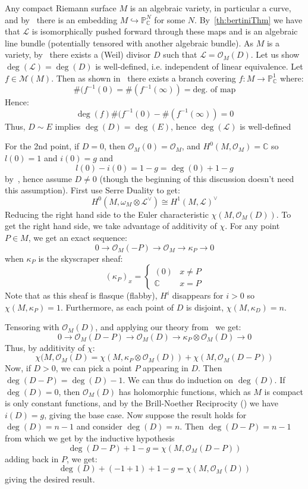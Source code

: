 \documentclass{ut-thesis}
\newenvironment{Proof}[1][]
  {\begin{ProofTcb}[#1]}
  {\end{ProofTcb}}
\newcommand{\C}{{\mathbb{C}}}
\renewcommand{\P}{{\mathbb{P}}}
\newcommand{\CM}{{\mathcal{M}}}
\newcommand{\CL}{{\mathcal{L}}}
\newcommand{\CO}{{\mathcal{O}}}
\renewcommand{\deg}{{\operatorname{deg}}}
\begin{document}
\begin{Proof}
  Any compact Riemann surface $M$ is an algebraic
  variety, in particular a curve, and by~\cite[section~6.1]{NateAlgGeo} there is an embedding $M
  \hookrightarrow \P_\C^N$ for some $N$. By~\cref{th:bertiniThm} we have
  that $\CL$ is isomorphically pushed forward through these maps and is an algebraic line bundle (potentially
  tensored with another algebraic bundle). As $M$ is
  a variety, by~\cite[section~4.3]{NateAlgGeo} there exists a (Weil) divisor $D$ such that $\CL = \CO_M(D)$.
  Let us show $\deg(\CL) = \deg(D)$ is well-defined, i.e. independent of linear equivalence. Let $f \in
  \CM(M)$. Then as shown in~\cite[section~6.3]{NateComplexAnalysis} there exists a branch covering $f: M \to
  \P_\C^1$ where:
  \[
    \#(f^{-1}(0) = \#(f^{-1}(\infty)) = \text{deg. of map}
  \]
  Hence:
  \[
    \deg(f) \#(f^{-1}(0) - \#(f^{-1}(\infty)) = 0
  \]
  Thus, $D\sim E$ implies $\deg(D) = \deg(E)$, hence $\deg(\CL)$ is well-defined

  For the 2nd point, if $D = 0$, then $\CO_M(0) = \CO_M$, and $H^0(M, \CO_M) = \C$ so $l(0) = 1$ and $i(0) =
  g$ and
  \[
    l(0) - i(0) = 1-g = \deg(0) + 1-g
  \]
  by~\cite[section~6.3]{NateComplexAnalysis}, hence assume $D \ne 0$ (though the beginning of this discussion
  doesn't need this assumption). First use Serre Duality to get:
  \[
    H^0(M, \omega_M\otimes \CL^\vee) \cong H^1(M, \CL)^\vee
  \]
  Reducing the right hand side to the Euler characteristic $\chi(M, \CO_M(D))$. To get the right hand side, we
  take advantage of additivity of $\chi$. For any point $P \in M$, we get an exact sequence:
  \[
    0 \to \CO_M(-P) \to \CO_M \to \kappa_P \to 0
  \]
  when $\kappa_P$ is the skyscraper sheaf:
  \[
    (\kappa_P)_x = \begin{cases}
      (0) & x \ne P\\
      \C & x = P
    \end{cases}
  \]
  Note that as this sheaf is flasque (flabby), $H^i$ disappears for $i > 0$ so $\chi(M, \kappa_P) = 1$. Furthermore, as
  each point of $D$ is disjoint, $\chi(M, \kappa_D) = n$.


  Tensoring with $\CO_M(D)$, and applying our theory from~\cite[section~4.3]{NateAlgGeo} we get:
  \[
    0 \to \CO_M(D-P) \to \CO_M(D) \to \kappa_P \otimes \CO_M(D) \to 0
  \]
  Thus, by additivity of $\chi$:
  \[
    \chi(M, \CO_M(D) = \chi(M, \kappa_P\otimes \CO_M(D)) + \chi(M, \CO_M(D-P))
  \]
  Now, if $D > 0$, we can pick a point $P$ appearing in $D$. Then $\deg(D-P) = \deg(D)-1$. We can thus do
  induction on $\deg(D)$.  If $\deg(D) = 0$, then $\CO_M(D)$ has holomorphic functions, which as $M$ is
  compact is only constant functions, and by the Brill-Noether Reciprocity (\cite{NateComplexAnalysis}) we
  have $i(D) = g$, giving the base case. Now suppose the result holds for $\deg(D) = n-1$ and consider
  $\deg(D) = n$. Then $\deg(D-P) = n-1$ from which we get by the inductive hypothesis
  \[
    \deg(D-P)+1-g = \chi(M, \CO_M(D-P))
  \]
  adding back in $P$, we get:
  \[
    \deg(D)+(-1+1)+1-g = \chi(M, \CO_M(D))
  \]
  giving the desired result.


\end{Proof}
\end{document}
